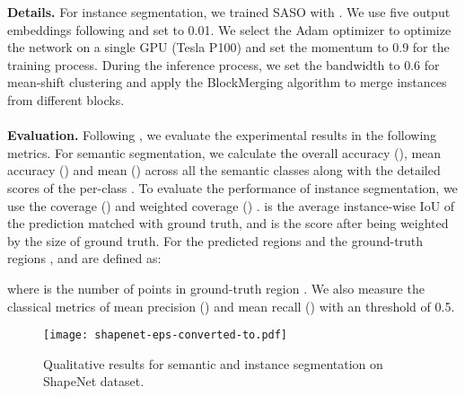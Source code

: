 \documentclass{cta-author}
\begin{document}
\noindent \textbf{Details.}
For instance segmentation, we trained SASO with . We use five output embeddings following \cite{wang2019associatively} and set  to 0.01. We select the Adam optimizer to optimize the network on a single GPU (Tesla P100) and set the momentum to 0.9 for the training process. During the inference process, we set the bandwidth to 0.6 for mean-shift clustering and apply the BlockMerging algorithm \cite{wang2018sgpn} to merge instances from different blocks.\\ \hspace*{\fill} \\
\noindent \textbf{Evaluation.} Following \cite{wang2019associatively}, we evaluate the experimental results in the following metrics. For semantic segmentation, we calculate the overall accuracy (), mean accuracy () and mean  () across all the semantic classes along with the detailed scores of the per-class . To evaluate the performance of instance segmentation, we use the coverage () and weighted coverage () \cite{ren2017end, liu2017sgn, zhuo2017indoor}.
 is the average instance-wise IoU of the prediction matched with ground truth, and  is the  score after being weighted by the size of ground truth.
For the predicted regions  and the ground-truth regions ,  and  are defined as:



where  is the number of points in ground-truth region .
We also measure the classical metrics of mean precision () and mean recall () with an  threshold of 0.5. \\
\begin{figure}[h]
  \begin{center}
   \centerline{\texttt{[image: shapenet-eps-converted-to.pdf]}}
  \end{center}
  \caption{Qualitative results for semantic and instance segmentation on ShapeNet dataset.}
  \label{fig6}
\end{figure}
\end{document}
